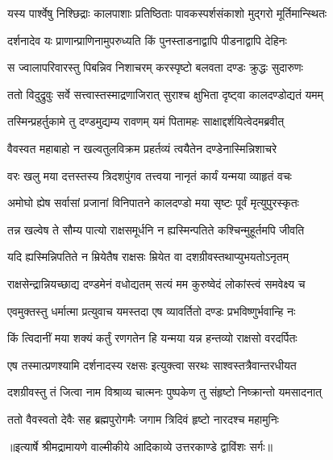 \twolineshloka
{यस्य पार्श्वेषु निश्छिद्राः कालपाशाः प्रतिष्ठिताः}
{पावकस्पर्शसंकाशो मुद्गरो मूर्तिमान्स्थितः} %

\twolineshloka
{दर्शनादेव यः प्राणान्प्राणिनामुपरुध्यति}
{किं पुनस्ताडनाद्वापि पीडनाद्वापि देहिनः} %

\twolineshloka
{स ज्वालापरिवारस्तु पिबन्निव निशाचरम्}
{करस्पृष्टो बलवता दण्डः क्रुद्धः सुदारुणः} %

\twolineshloka
{ततो विदुद्रुवुः सर्वे सत्त्वास्तस्माद्रणाजिरात्}
{सुराश्च क्षुभिता दृष्ट्वा कालदण्डोद्यतं यमम्} %

\twolineshloka
{तस्मिन्प्रहर्तुकामे तु दण्डमुद्यम्य रावणम्}
{यमं पितामहः साक्षाद्दर्शयित्वेदमब्रवीत्} %

\twolineshloka
{वैवस्वत महाबाहो न खल्वतुलविक्रम}
{प्रहर्तव्यं त्वयैतेन दण्डेनास्मिन्निशाचरे} %

\twolineshloka
{वरः खलु मया दत्तस्तस्य त्रिदशपुंगव}
{तत्त्वया नानृतं कार्यं यन्मया व्याहृतं वचः} %

\twolineshloka
{अमोघो ह्येष सर्वासां प्रजानां विनिपातने}
{कालदण्डो मया सृष्टः पूर्वं मृत्युपुरस्कृतः} %

\twolineshloka
{तन्न खल्वेष ते सौम्य पात्यो राक्षसमूर्धनि}
{न ह्यस्मिन्पतिते कश्चिन्मुहूर्तमपि जीवति} %

\twolineshloka
{यदि ह्यस्मिन्निपतिते न म्रियेतैष राक्षसः}
{म्रियेत वा दशग्रीवस्तथाप्युभयतोऽनृतम्} %

\twolineshloka
{राक्षसेन्द्रान्नियच्छाद्य दण्डमेनं वधोद्यतम्}
{सत्यं मम कुरुष्वेदं लोकांस्त्वं समवेक्ष्य च} %

\twolineshloka
{एवमुक्तस्तु धर्मात्मा प्रत्युवाच यमस्तदा}
{एष व्यावर्तितो दण्डः प्रभविष्णुर्भवान्हि नः} %

\twolineshloka
{किं त्विदानीं मया शक्यं कर्तुं रणगतेन हि}
{यन्मया यन्न हन्तव्यो राक्षसो वरदर्पितः} %

\twolineshloka
{एष तस्मात्प्रणश्यामि दर्शनादस्य रक्षसः}
{इत्युक्त्वा सरथः साश्वस्तत्रैवान्तरधीयत} %

\twolineshloka
{दशग्रीवस्तु तं जित्वा नाम विश्राव्य चात्मनः}
{पुष्पकेण तु संहृष्टो निष्क्रान्तो यमसादनात्} %

\twolineshloka
{ततो वैवस्वतो देवैः सह ब्रह्मपुरोगमैः}
{जगाम त्रिदिवं हृष्टो नारदश्च महामुनिः} %


{॥इत्यार्षे श्रीमद्रामायणे वाल्मीकीये आदिकाव्ये उत्तरकाण्डे द्वाविंशः सर्गः॥}

